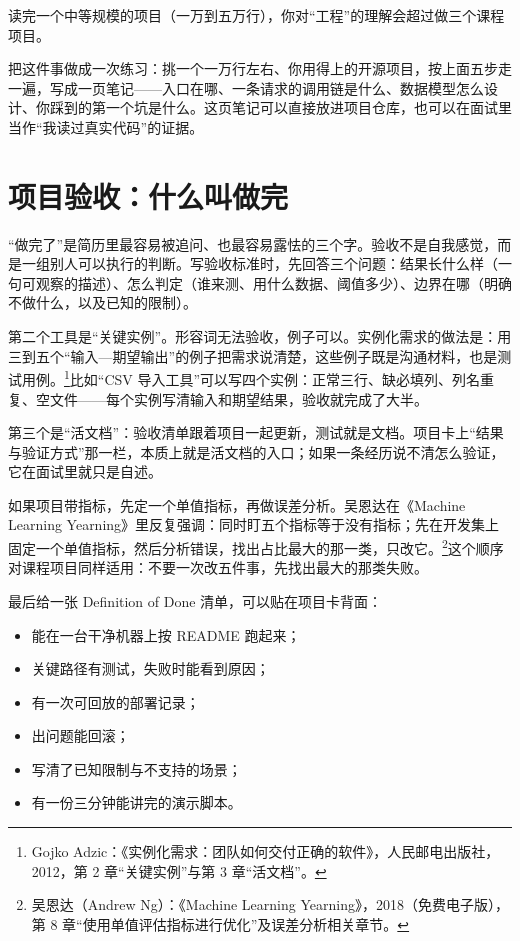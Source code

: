 \documentclass[UTF8,zihao=5,openany]{ctexbook}
\begin{document}
读完一个中等规模的项目（一万到五万行），你对“工程”的理解会超过做三个课程项目。

把这件事做成一次练习：挑一个一万行左右、你用得上的开源项目，按上面五步走一遍，写成一页笔记——入口在哪、一条请求的调用链是什么、数据模型怎么设计、你踩到的第一个坑是什么。这页笔记可以直接放进项目仓库，也可以在面试里当作“我读过真实代码”的证据。


\section{项目验收：什么叫做完}

“做完了”是简历里最容易被追问、也最容易露怯的三个字。验收不是自我感觉，而是一组别人可以执行的判断。写验收标准时，先回答三个问题：结果长什么样（一句可观察的描述）、怎么判定（谁来测、用什么数据、阈值多少）、边界在哪（明确不做什么，以及已知的限制）。

第二个工具是“关键实例”。形容词无法验收，例子可以。实例化需求的做法是：用三到五个“输入—期望输出”的例子把需求说清楚，这些例子既是沟通材料，也是测试用例。\footnote{Gojko Adzic：《实例化需求：团队如何交付正确的软件》，人民邮电出版社，2012，第 2 章“关键实例”与第 3 章“活文档”。}比如“CSV 导入工具”可以写四个实例：正常三行、缺必填列、列名重复、空文件——每个实例写清输入和期望结果，验收就完成了大半。

第三个是“活文档”：验收清单跟着项目一起更新，测试就是文档。项目卡上“结果与验证方式”那一栏，本质上就是活文档的入口；如果一条经历说不清怎么验证，它在面试里就只是自述。

如果项目带指标，先定一个单值指标，再做误差分析。吴恩达在《Machine Learning Yearning》里反复强调：同时盯五个指标等于没有指标；先在开发集上固定一个单值指标，然后分析错误，找出占比最大的那一类，只改它。\footnote{吴恩达（Andrew Ng）：《Machine Learning Yearning》，2018（免费电子版），第 8 章“使用单值评估指标进行优化”及误差分析相关章节。}这个顺序对课程项目同样适用：不要一次改五件事，先找出最大的那类失败。

最后给一张 Definition of Done 清单，可以贴在项目卡背面：
\begin{itemize}
\item 能在一台干净机器上按 README 跑起来；
\item 关键路径有测试，失败时能看到原因；
\item 有一次可回放的部署记录；
\item 出问题能回滚；
\item 写清了已知限制与不支持的场景；
\item 有一份三分钟能讲完的演示脚本。
\end{itemize}
\end{document}
